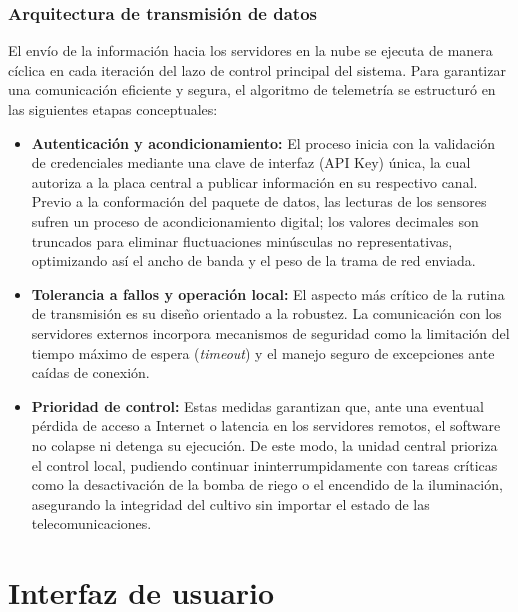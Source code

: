 \subsubsection{Arquitectura de transmisión de datos}

El envío de la información hacia los servidores en la nube se ejecuta de manera cíclica en cada iteración del lazo de control principal del sistema. Para garantizar una comunicación eficiente y segura, el algoritmo de telemetría se estructuró en las siguientes etapas conceptuales:

\begin{itemize}
    \item \textbf{Autenticación y acondicionamiento:} El proceso inicia con la validación de credenciales mediante una clave de interfaz (API Key) única, la cual autoriza a la placa central a publicar información en su respectivo canal. Previo a la conformación del paquete de datos, las lecturas de los sensores sufren un proceso de acondicionamiento digital; los valores decimales son truncados para eliminar fluctuaciones minúsculas no representativas, optimizando así el ancho de banda y el peso de la trama de red enviada.
    \item \textbf{Tolerancia a fallos y operación local:} El aspecto más crítico de la rutina de transmisión es su diseño orientado a la robustez. La comunicación con los servidores externos incorpora mecanismos de seguridad como la limitación del tiempo máximo de espera (\textit{timeout}) y el manejo seguro de excepciones ante caídas de conexión.
    \item \textbf{Prioridad de control:} Estas medidas garantizan que, ante una eventual pérdida de acceso a Internet o latencia en los servidores remotos, el software no colapse ni detenga su ejecución. De este modo, la unidad central prioriza el control local, pudiendo continuar ininterrumpidamente con tareas críticas como la desactivación de la bomba de riego o el encendido de la iluminación, asegurando la integridad del cultivo sin importar el estado de las telecomunicaciones.
\end{itemize}


\section{Interfaz de usuario}
\label{sec:interfaz_usuario}

